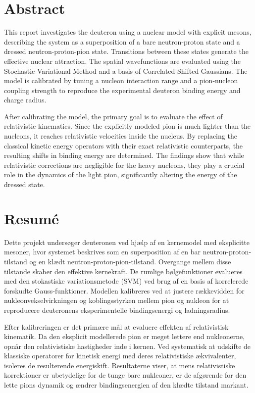 \documentclass[a4paper,oneside,article,12pt]{memoir}
\begin{document}

\chapter*{Abstract}
\pagestyle{empty}
This report investigates the deuteron using a nuclear model with explicit mesons, describing the system as a superposition of a bare neutron-proton state and a dressed neutron-proton-pion state. Transitions between these states generate the effective nuclear attraction. The spatial wavefunctions are evaluated using the Stochastic Variational Method and a basis of Correlated Shifted Gaussians. The model is calibrated by tuning a nucleon interaction range and a pion-nucleon coupling strength to reproduce the experimental deuteron binding energy and charge radius. 

After calibrating the model, the primary goal is to evaluate the effect of relativistic kinematics. Since the explicitly modeled pion is much lighter than the nucleons, it reaches relativistic velocities inside the nucleus. By replacing the classical kinetic energy operators with their exact relativistic counterparts, the resulting shifts in binding energy are determined. The findings show that while relativistic corrections are negligible for the heavy nucleons, they play a crucial role in the dynamics of the light pion, significantly altering the energy of the dressed state. 

\newpage
\chapter*{Resumé}
\pagestyle{empty}
Dette projekt undersøger deuteronen ved hjælp af en kernemodel med eksplicitte mesoner, hvor systemet beskrives som en superposition af en bar neutron-proton-tilstand og en klædt neutron-proton-pion-tilstand. Overgange mellem disse tilstande skaber den effektive kernekraft. De rumlige bølgefunktioner evalueres med den stokastiske variationsmetode (SVM) ved brug af en basis af korrelerede forskudte Gauss-funktioner. Modellen kalibreres ved at justere rækkevidden for nukleonvekselvirkningen og koblingsstyrken mellem pion og nukleon for at reproducere deuteronens eksperimentelle bindingsenergi og ladningsradius. 

Efter kalibreringen er det primære mål at evaluere effekten af relativistisk kinematik. Da den eksplicit modellerede pion er meget lettere end nukleonerne, opnår den relativistiske hastigheder inde i kernen. Ved systematisk at udskifte de klassiske operatorer for kinetisk energi med deres relativistiske ækvivalenter, isoleres de resulterende energiskift. Resultaterne viser, at mens relativistiske korrektioner er ubetydelige for de tunge bare nukleoner, er de afgørende for den lette pions dynamik og ændrer bindingsenergien af den klædte tilstand markant.
\end{document}
